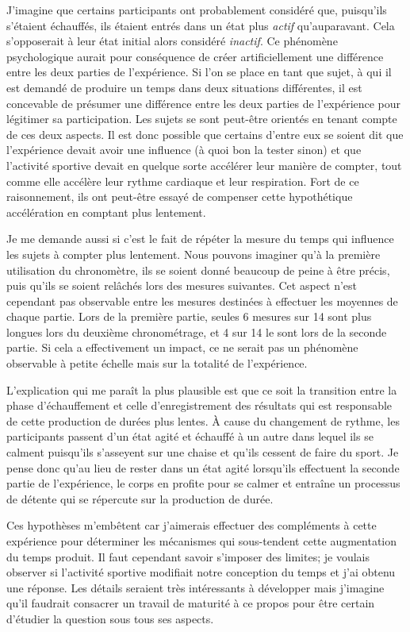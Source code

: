 \documentclass[12pt,fleqn,oneside,french,openany]{book} %
\begin{document}
J'imagine que certains participants ont probablement considéré que, puisqu'ils s'étaient échauffés, ils étaient entrés dans un état plus \emph{actif} qu'auparavant. Cela s'opposerait à leur état initial alors considéré \emph{inactif}. Ce phénomène psychologique aurait pour conséquence de créer artificiellement une différence entre les deux parties de l'expérience. Si l'on se place en tant que sujet, à qui il est demandé de produire un temps dans deux situations différentes, il est concevable de présumer une différence entre les deux parties de l'expérience pour légitimer sa participation. Les sujets se sont peut-être orientés en tenant compte de ces deux aspects. Il est donc possible que certains d'entre eux se soient dit que l'expérience devait avoir une influence (à quoi bon la tester sinon) et que l'activité sportive devait en quelque sorte accélérer leur manière de compter, tout comme elle accélère leur rythme cardiaque et leur respiration. Fort de ce raisonnement, ils ont peut-être essayé de compenser cette hypothétique accélération en comptant plus lentement.

Je me demande aussi si c'est le fait de répéter la mesure du temps qui influence les sujets à compter plus lentement. Nous pouvons imaginer qu'à la première utilisation du chronomètre, ils se soient donné beaucoup de peine à être précis, puis qu'ils se soient relâchés lors des mesures suivantes. Cet aspect n'est cependant pas observable entre les mesures destinées à effectuer les moyennes de chaque partie. Lors de la première partie, seules 6 mesures sur 14 sont plus longues lors du deuxième chronométrage, et 4 sur 14 le sont lors de la seconde partie. Si cela a effectivement un impact, ce ne serait pas un phénomène observable à petite échelle mais sur la totalité de l'expérience.

L'explication qui me paraît la plus plausible est que ce soit la transition entre la phase d'échauffement et celle d'enregistrement des résultats qui est responsable de cette production de durées plus lentes. À cause du changement de rythme, les participants passent d'un état agité et échauffé à un autre dans lequel ils se calment puisqu'ils s'asseyent sur une chaise et qu'ils cessent de faire du sport. Je pense donc qu'au lieu de rester dans un état agité lorsqu'ils effectuent la seconde partie de l'expérience, le corps en profite pour se calmer et entraîne un processus de détente qui se répercute sur la production de durée.

Ces hypothèses m'embêtent car j'aimerais effectuer des compléments à cette expérience pour déterminer les mécanismes qui sous-tendent cette augmentation du temps produit. Il faut cependant savoir s'imposer des limites; je voulais observer si l'activité sportive modifiait notre conception du temps et j'ai obtenu une réponse. Les détails seraient très intéressants à développer mais j'imagine qu'il faudrait consacrer un travail de maturité à ce propos pour être certain d'étudier la question sous tous ses aspects.
\end{document}
